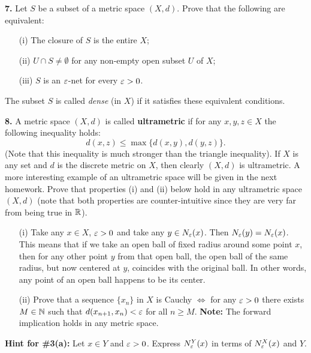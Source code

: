 \documentclass[11pt]{amsart}
\begin{document}
{\bf 7.} Let $S$ be a subset of a metric space $(X,d)$. Prove that the following
are equivalent:
\begin{itemize}
\item[(i)] The closure of $S$ is the entire $X$;
\item[(ii)]  $U\cap S\neq\emptyset$ for any non-empty open subset $U$ of $X$;
\item[(iii)] $S$ is an ${\varepsilon}$-net for every ${\varepsilon}>0$.
\end{itemize}
The subset $S$ is called {\it dense} (in $X$) if it satisfies these equivalent conditions.

\skv
{\bf 8.} A metric space $(X,d)$ is called {\bf ultrametric} if for any $x,y,z\in X$
the following inequality holds:
$$d(x,z)\leq \max\{d(x,y), d(y,z)\}.$$ 
(Note that this inequality is much stronger than the triangle inequality). 
If $X$ is any set and $d$ is the discrete metric on $X$, then clearly $(X,d)$ is ultrametric.
A more interesting example of an ultrametric space will be given in the next homework.
\skv
Prove that properties (i) and (ii) below hold in any ultrametric space $(X,d)$
(note that both properties are counter-intuitive since they are very far from
being true in ${\mathbb R}$).
\begin{itemize}
\item[(i)] Take any $x\in X$, ${\varepsilon}>0$ and take any $y\in N_{{\varepsilon}}(x)$. Then
$N_{{\varepsilon}}(y)=N_{{\varepsilon}}(x)$. This means that if we take an open ball of fixed
radius around some point $x$, then for any other point $y$ from that open ball, the open
ball of the same radius, but now centered at $y$, coincides with the original ball.
In other words, any point of an open ball happens to be its center.
\item[(ii)] Prove that a sequence $\{x_n\}$ in $X$ is Cauchy $\iff$
for any ${\varepsilon}>0$ there exists $M\in{\mathbb N}$ such that $d(x_{n+1},x_n)<{\varepsilon}$
for all $n\geq M$. {\bf Note:} The forward implication holds in any metric
space. 
\end{itemize}
\newpage
{\bf Hint for \#3(a):} Let $x\in Y$ and ${\varepsilon}>0$. Express $N_{{\varepsilon}}^Y(x)$ in terms of $N_{{\varepsilon}}^X(x)$ and $Y$.
\end{document}
